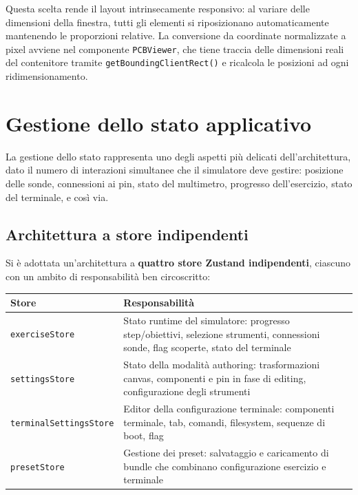 Questa scelta rende il layout intrinsecamente responsivo: al variare delle dimensioni della finestra, tutti gli elementi si riposizionano automaticamente mantenendo le proporzioni relative. La conversione da coordinate normalizzate a pixel avviene nel componente \texttt{PCBViewer}, che tiene traccia delle dimensioni reali del contenitore tramite \texttt{getBoundingClientRect()} e ricalcola le posizioni ad ogni ridimensionamento.


\section{Gestione dello stato applicativo}
\label{sec:gestione-stato}

La gestione dello stato rappresenta uno degli aspetti più delicati dell'architettura, dato il numero di interazioni simultanee che il simulatore deve gestire: posizione delle sonde, connessioni ai pin, stato del multimetro, progresso dell'esercizio, stato del terminale, e così via.

\subsection{Architettura a store indipendenti}

Si è adottata un'architettura a \textbf{quattro store Zustand indipendenti}, ciascuno con un ambito di responsabilità ben circoscritto:

\begin{table}[H]
\centering
\begin{tabular}{p{4.5cm} p{9cm}}
\toprule
\textbf{Store} & \textbf{Responsabilità} \\
\midrule
\texttt{exerciseStore} & Stato runtime del simulatore: progresso step/obiettivi, selezione strumenti, connessioni sonde, flag scoperte, stato del terminale \\
\texttt{settingsStore} & Stato della modalità authoring: trasformazioni canvas, componenti e pin in fase di editing, configurazione degli strumenti \\
\texttt{terminalSettingsStore} & Editor della configurazione terminale: componenti terminale, tab, comandi, filesystem, sequenze di boot, flag \\
\texttt{presetStore} & Gestione dei preset: salvataggio e caricamento di bundle che combinano configurazione esercizio e terminale \\
\bottomrule
\end{tabular}
\end{table}


